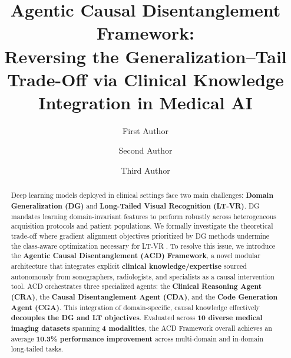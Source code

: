 \documentclass[runningheads]{llncs}
\begin{document}
\title{Agentic Causal Disentanglement Framework: \\ Reversing the Generalization–Tail Trade-Off via Clinical Knowledge Integration in Medical AI} 


\author{First Author \and
Second Author \and
Third Author}



\maketitle


\begin{abstract}
Deep learning models deployed in clinical settings face two main challenges: \textbf{Domain Generalization (DG)} and \textbf{Long-Tailed Visual Recognition (LT-VR)}. DG mandates learning domain-invariant features to perform robustly across heterogeneous acquisition protocols and patient populations. We formally investigate the theoretical trade-off where gradient alignment objectives prioritized by DG methods undermine the class-aware optimization necessary for LT-VR . To resolve this issue, we introduce the \textbf{Agentic Causal Disentanglement (ACD) Framework}, a novel modular architecture that integrates explicit \textbf{clinical knowledge/expertise} sourced autonomously from sonographers, radiologists, and specialists as a causal intervention tool. ACD orchestrates three specialized agents: the \textbf{Clinical Reasoning Agent (CRA)}, the \textbf{Causal Disentanglement Agent (CDA)}, and the \textbf{Code Generation Agent (CGA)}. This integration of domain-specific, causal knowledge effectively \textbf{decouples the DG and LT objectives}. Evaluated across \textbf{10 diverse medical imaging datasets} spanning \textbf{4 modalities}, the ACD Framework overall achieves an average \textbf{10.3\% performance improvement} across multi-domain and in-domain long-tailed tasks. 
\end{abstract}
\end{document}
